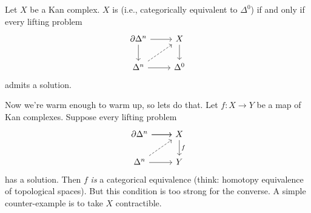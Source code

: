 \begin{lemma}
Let $X$ be a Kan complex. $X$ is  (i.e., categorically equivalent to
$\Delta^{0}$) if and only if every lifting problem
\[
	\begin{tikzcd}
		\partial \Delta^{n} \ar[r] \ar[d] & X \ar[d] \\
		\Delta^{n} \ar[ur,dashed] \ar[r] & \Delta^{0}
	\end{tikzcd}
\]
admits a solution.
\end{lemma}
Now we're warm enough to warm up, so lets do that. Let $f:X\to Y$ be a map of Kan
complexes. Suppose every lifting problem
\[
\begin{tikzcd}
	\partial \Delta^{n} \ar[r] \ar[r] & X \ar[d,"f"] \\
	\Delta^{n} \ar[ur,dashed] \ar[r] & Y
\end{tikzcd}
\]
has a solution. Then $f$ \emph{is} a categorical equivalence (think: homotopy equivalence
of topological spaces). But this condition is too strong for the converse. A simple
counter-example is to take $X$ contractible.

